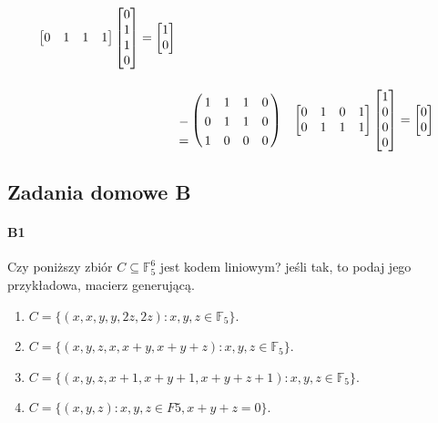 \documentclass[a4paper,12pt]{article}
\theoremstyle{definition}%
\theoremstyle{definition}
\theoremstyle{problem}
\let\bbordermatrix\bordermatrix
\begin{document}
\begin{enumerate}[label=\alph*)]
\begin{align*}
\begin{bmatrix}
0& 1& 1& 1 
\end{bmatrix}\begin{bmatrix}
0\\1\\1\\0
\end{bmatrix}=\begin{bmatrix}
1\\0
\end{bmatrix}\\
&\bbordermatrix{
&&&&\cr
& 1 & 1 & 1 & 0\cr
-& 0 & 1 & 1 & 0\cr
=& 1 & 0 & 0 & 0
}& \begin{bmatrix}
0& 1& 0& 1\\
0& 1& 1& 1 
\end{bmatrix}\begin{bmatrix}
1\\0\\0\\0
\end{bmatrix}=\begin{bmatrix}
0\\0
\end{bmatrix}\\
\end{align*}
\end{enumerate}


\subsection{Zadania domowe B}
\paragraph{B1} Czy poniższy zbiór $C\subseteq \mathbb{F}^6_5$ jest kodem liniowym? jeśli tak, to podaj jego przykładowa, macierz generującą.
\begin{enumerate}[label=\alph*)]
\item $C = \{(x, x, y, y, 2z, 2z): x, y, z \in \mathbb{F}_5\}$.
\item $C = \{(x, y, z, x, x + y, x + y + z): x, y, z \in \mathbb{F}_5\}$.
\item $C = \{(x, y, z, x + 1, x + y + 1, x + y + z + 1): x, y, z \in \mathbb{F}_5\}$.
\item $C = \{(x, y, z): x, y, z \in F5, x + y + z = 0\}$.
\end{enumerate}
\end{document}
